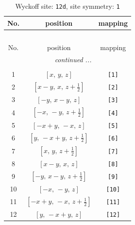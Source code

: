 \documentclass[fleqn,8pt]{jsarticle}
\begin{document}
\begin{longtable}{ccc}
\caption{Wyckoff site: {\tt 12d}, site symmetry: {\tt 1}}
 \\
 \hline \hline
No. & position & mapping \\ \hline \endfirsthead

\multicolumn{2}{l}{\tablename\ \thetable{}} \\
 \hline \hline
No. & position & mapping \\ \hline \endhead

 \hline \hline
\multicolumn{2}{r}{\footnotesize\it continued ...} \\ \endfoot

 \hline \hline
\multicolumn{2}{r}{} \\ \endlastfoot

1 & $\left[ x,\, y,\, z \right]$ & {\tt [1]} \\ \hline
2 & $\left[ x - y,\, x,\, z + \frac{1}{2} \right]$ & {\tt [2]} \\ \hline
3 & $\left[ - y,\, x - y,\, z \right]$ & {\tt [3]} \\ \hline
4 & $\left[ - x,\, - y,\, z + \frac{1}{2} \right]$ & {\tt [4]} \\ \hline
5 & $\left[ - x + y,\, - x,\, z \right]$ & {\tt [5]} \\ \hline
6 & $\left[ y,\, - x + y,\, z + \frac{1}{2} \right]$ & {\tt [6]} \\ \hline
7 & $\left[ x,\, y,\, z + \frac{1}{2} \right]$ & {\tt [7]} \\ \hline
8 & $\left[ x - y,\, x,\, z \right]$ & {\tt [8]} \\ \hline
9 & $\left[ - y,\, x - y,\, z + \frac{1}{2} \right]$ & {\tt [9]} \\ \hline
10 & $\left[ - x,\, - y,\, z \right]$ & {\tt [10]} \\ \hline
11 & $\left[ - x + y,\, - x,\, z + \frac{1}{2} \right]$ & {\tt [11]} \\ \hline
12 & $\left[ y,\, - x + y,\, z \right]$ & {\tt [12]} \\
\end{longtable}
\end{document}
